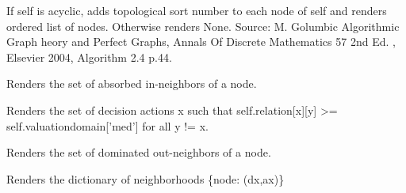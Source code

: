 \documentclass[letterpaper,10pt,english]{sphinxmanual}
\begin{document}
\begin{fulllineitems}
\begin{fulllineitems}
\end{fulllineitems}


\begin{fulllineitems}
\label{techDoc:digraphs.Digraph.topologicalSort}
If self is acyclic, adds topological sort number to each node of self
and renders ordered list of nodes. Otherwise renders None.
Source: M. Golumbic Algorithmic Graph heory and Perfect Graphs,
Annals Of Discrete Mathematics 57 2nd Ed. , Elsevier 2004, Algorithm 2.4 p.44.

\end{fulllineitems}


\begin{fulllineitems}
\label{techDoc:digraphs.Digraph.weakAneighbors}
Renders the set of absorbed in-neighbors of a node.

\end{fulllineitems}


\begin{fulllineitems}
\label{techDoc:digraphs.Digraph.weakCondorcetWinners}
Renders the set of decision actions x such that
self.relation{[}x{]}{[}y{]} \textgreater{}= self.valuationdomain{[}'med'{]}
for all y != x.

\end{fulllineitems}


\begin{fulllineitems}
\label{techDoc:digraphs.Digraph.weakDneighbors}
Renders the set of dominated out-neighbors of a node.

\end{fulllineitems}


\begin{fulllineitems}
\label{techDoc:digraphs.Digraph.weakGammaSets}
Renders the dictionary of neighborhoods \{node: (dx,ax)\}


\end{fulllineitems}
\end{fulllineitems}
\end{document}
